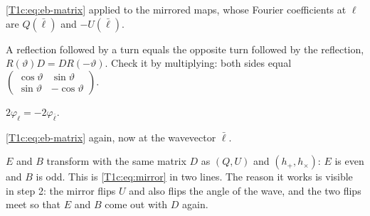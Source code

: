 \begin{explain}
  \item \eqref{T1c:eq:eb-matrix} applied to the mirrored maps, whose Fourier coefficients at $\bm\ell$ are $Q(\bar{\bm\ell})$ and $-U(\bar{\bm\ell})$.
  \item A reflection followed by a turn equals the opposite turn followed by the reflection, $R(\vartheta)D=DR(-\vartheta)$. Check it by multiplying: both sides equal $\begin{pmatrix}\cos\vartheta&\sin\vartheta\\ \sin\vartheta&-\cos\vartheta\end{pmatrix}$.
  \item $2\varphi_{\bm\ell}=-2\varphi_{\bar{\bm\ell}}$.
  \item \eqref{T1c:eq:eb-matrix} again, now at the wavevector $\bar{\bm\ell}$.
\end{explain}
$E$ and $B$ transform with the same matrix $D$ as $(Q,U)$ and $(h_+,h_\times)$: $E$ is even and $B$ is odd. This is \eqref{T1c:eq:mirror} in two lines. The reason it works is visible in step 2: the mirror flips $U$ and also flips the angle of the wave, and the two flips meet so that $E$ and $B$ come out with $D$ again.


